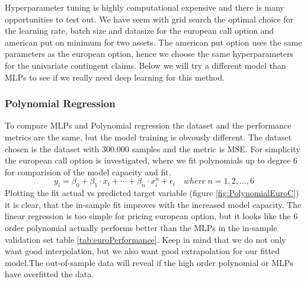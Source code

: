 Hyperparameter tuning is highly computational expensive and there is many opportunities to test out. We have seem with grid search the optimal choice for the learning rate, batch size and datasize for the european call option and american put on minimum for two assets. The american put option uses the same parameters as the european option, hence we choose the same hyperparameters for the univariate contingent claims. Below we will try a different model than MLPs to see if we really need deep learning for this method. 

\subsubsection{Polynomial Regression}
To compare MLPs and Polynomial regression the dataset and the performance metrics are the same, but the model training is obvously different. The dataset chosen is the dataset with 300.000 samples and the metric is MSE. For simplicity the european call option is investigated, where we fit polynomials up to degree 6 for comparision of the model capacity and fit.  
$$y_i=\beta_0 + \beta_1 \cdot x_i + \cdots + \beta_n \cdot x_i^n + \epsilon_i \quad where \ n=1,2,\ldots,6$$
Plotting the fit actual vs predicted target variable (figure \ref{fig:PolynomialEuroC}) it is clear, that the in-sample fit improves with the increased model capacity. The linear regression is too simple for pricing european option, but it looks like the 6 order polynomial actually performs better than the MLPs in the in-sample validation set table \ref{tab:euroPerformance}. Keep in mind that we do not only want good interpolation, but we also want good extrapolation for our fitted model.The out-of-sample data will reveal if the high order polynomial or MLPs have overfitted the data.\\

